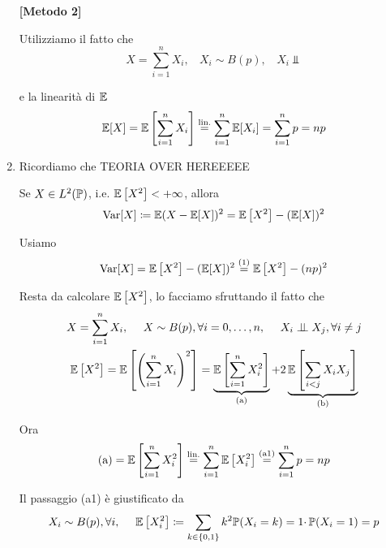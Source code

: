 \begin{enumerate}
\textbf{[Metodo 2]}

Utilizziamo il fatto che
\begin{equation*}
X=\sum\limits _{i=1}^{n} X_{i} ,\ \ \ \ X_{i} \sim B( p) ,\ \ \ \ X_{i} \Bot 
\end{equation*}

e la linearità di $\mathbb{E}$\begin{equation*}
\mathbb{E}[ X] =\mathbb{E}\left[\sum\limits _{i=1}^{n} X_{i}\right]\overset{\text{lin.}}{=}\sum\limits _{i=1}^{n}\mathbb{E}[ X_{i}] =\sum\limits _{i=1}^{n} p=np
\end{equation*}
\item Ricordiamo che TEORIA OVER HEREEEEE

Se $X\in L^{2}(\mathbb{P})$, i.e. $\mathbb{E}\left[ X^{2}\right] < +\infty $, allora
\begin{equation*}
\mathrm{Var}[ X] \coloneqq \mathbb{E}( X-\mathbb{E}[ X])^{2} =\mathbb{E}\left[ X^{2}\right] -(\mathbb{E}[ X])^{2}
\end{equation*}

Usiamo
\begin{equation*}
\mathrm{Var}[ X] =\mathbb{E}\left[ X^{2}\right] -(\mathbb{E}[ X])^{2}\overset{( 1)}{=}\mathbb{E}\left[ X^{2}\right] -( np)^{2}
\end{equation*}

Resta da calcolare $\mathbb{E}\left[ X^{2}\right]$, lo facciamo sfruttando il fatto che
\begin{gather*}
X=\sum\limits _{i=1}^{n} X_{i} ,\ \ \ \ X\sim B( p) ,\forall i=0,\dots ,n,\ \ \ \ X_{i} \perp \!\!\! \perp X_{j} ,\forall i\neq j\\
\mathbb{E}\left[ X^{2}\right] =\mathbb{E}\left[\left(\sum\limits _{i=1}^{n} X_{i}\right)^{2}\right] =\underbrace{\mathbb{E}\left[\sum\limits _{i=1}^{n} X_{i}^{2}\right]}_{\text{(a)}} +2\underbrace{\mathbb{E}\left[\sum\limits _{i< j} X_{i} X_{j}\right]}_{\text{(b)}}
\end{gather*}

Ora
\begin{equation*}
\text{(a)} =\mathbb{E}\left[\sum\limits _{i=1}^{n} X_{i}^{2}\right]\overset{\text{lin.}}{=}\sum\limits _{i=1}^{n}\mathbb{E}\left[ X_{i}^{2}\right]\overset{\text{(a1)}}{=}\sum\limits _{i=1}^{n} p=np
\end{equation*}

Il passaggio (a1) è giustificato da
\begin{equation*}
X_{i} \sim B( p) ,\forall i,\ \ \ \ \mathbb{E}\left[ X_{i}^{2}\right] \coloneqq \sum\limits _{k\in \{0,1\}} k^{2}\mathbb{P}( X_{i} =k) =1\cdotp \mathbb{P}( X_{i} =1) =p
\end{equation*}


\end{enumerate}
